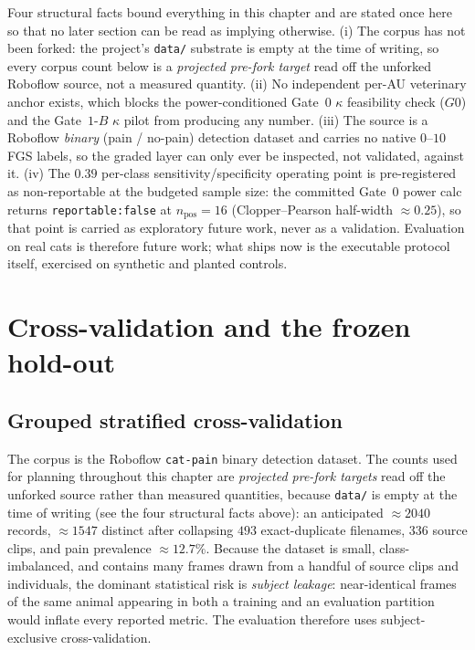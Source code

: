 Four structural facts bound everything in this chapter and are stated once here so that no later
section can be read as implying otherwise. (i) The corpus has not been forked: the project's
\texttt{data/} substrate is empty at the time of writing, so every corpus count below is a
\emph{projected pre-fork target} read off the unforked Roboflow source, not a measured quantity.
(ii) No independent per-AU veterinary anchor exists, which blocks the power-conditioned Gate~0
$\kappa$ feasibility check ($G0$) and the Gate~$1\text{-}B$ $\kappa$ pilot from producing any
number. (iii) The source is a Roboflow \emph{binary} (pain / no-pain) detection dataset and
carries no native $0\text{--}10$ FGS labels, so the graded layer can only ever be inspected, not
validated, against it. (iv) The $0.39$ per-class sensitivity/specificity operating point is
pre-registered as non-reportable at the budgeted sample size: the committed Gate~0 power calc
returns \texttt{reportable:false} at $n_{\text{pos}}{=}16$ (Clopper--Pearson half-width
$\approx 0.25$), so that point is carried as exploratory future work, never as a validation.
Evaluation on real cats is therefore future work; what ships now is the executable protocol
itself, exercised on synthetic and planted controls.

\section{Cross-validation and the frozen hold-out}
\label{sec:cv-holdout}

\subsection{Grouped stratified cross-validation}

The corpus is the Roboflow \texttt{cat-pain} binary detection dataset. The counts used for
planning throughout this chapter are \emph{projected pre-fork targets} read off the unforked
source rather than measured quantities, because \texttt{data/} is empty at the time of writing
(see the four structural facts above): an anticipated $\approx 2040$ records, $\approx 1547$
distinct after collapsing $493$ exact-duplicate filenames, $336$ source clips, and pain
prevalence $\approx 12.7\%$. Because the dataset is
small, class-imbalanced, and contains many frames drawn from a handful of source clips and
individuals, the dominant statistical risk is \emph{subject leakage}: near-identical frames of
the same animal appearing in both a training and an evaluation partition would inflate every
reported metric. The evaluation therefore uses subject-exclusive cross-validation.

